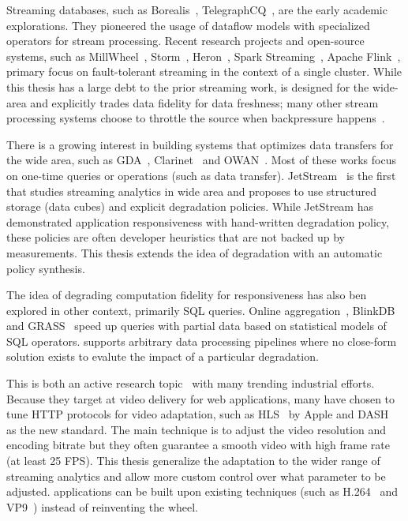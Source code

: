  Streaming databases, such as
Borealis~\cite{abadi2005design},
TelegraphCQ~\cite{chandrasekaran2003telegraphcq}, are the early academic
explorations. They pioneered the usage of dataflow models with specialized
operators for stream processing. Recent research projects and open-source
systems, such as MillWheel~\cite{akidau2013millwheel},
Storm~\cite{toshniwal2014storm}, Heron~\cite{kulkarni2015twitter}, Spark
Streaming~\cite{zaharia2012discretized}, Apache Flink~\cite{carbone2015apache},
primary focus on fault-tolerant streaming in the context of a single
cluster. While this thesis has a large debt to the prior streaming work,
\sysname{} is designed for the wide-area and explicitly trades data fidelity for
data freshness; many other stream processing systems choose to throttle the
source when backpressure happens~\cite{kulkarni2015twitter}.

 There is a growing interest in building systems that optimizes
data transfers for the wide area, such as GDA~\cite{pu2015low},
Clarinet~\cite{viswanathan2016clarinet} and OWAN~\cite{jin2016optimizing}.  Most
of these works focus on one-time queries or operations (such as data
transfer). JetStream~\cite{rabkin2014aggregation} is the first that studies
streaming analytics in wide area and proposes to use structured storage (data
cubes) and explicit degradation policies. While JetStream has demonstrated
application responsiveness with hand-written degradation policy, these policies
are often developer heuristics that are not backed up by measurements. This
thesis extends the idea of degradation with an automatic policy synthesis.

 The idea of degrading computation fidelity for
responsiveness has also ben explored in other context, primarily SQL
queries. Online aggregation~\cite{hellerstein1997online},
BlinkDB~\cite{agarwal2013blinkdb} and GRASS~\cite{ananthanarayanan2014grass}
speed up queries with partial data based on statistical models of SQL
operators. \sysname{} supports arbitrary data processing pipelines where no
close-form solution exists to evalute the impact of a particular degradation.

 This is both an active research
topic~\cite{sun2016cs2p, yin2015control} with many trending industrial efforts.
Because they target at video delivery for web applications, many have chosen to
tune HTTP protocols for video adaptation, such as HLS~\cite{pantos2016http} by
Apple and DASH~\cite{michalos2012dynamic} as the new standard. The main
technique is to adjust the video resolution and encoding bitrate but they often
guarantee a smooth video with high frame rate (at least 25 FPS). This thesis
generalize the adaptation to the wider range of streaming analytics and allow
more custom control over what parameter to be adjusted. \sysname{} applications
can be built upon existing techniques (such as H.264~\cite{richardson2011h} and
VP9~\cite{grange2016vp9}) instead of reinventing the wheel.

